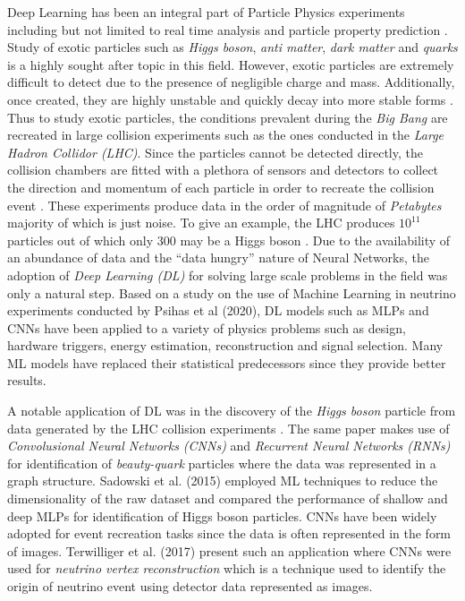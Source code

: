Deep Learning has been an integral part of Particle Physics
experiments \cite{radovic2018machine, sadowski2015deep, de2019machine,
  psihas2020review, terwilliger2017vertex} including but not limited
to real time analysis and particle property prediction
\cite{radovic2018machine}. Study of exotic particles such as
\emph{Higgs boson}, \emph{anti matter}, \emph{dark matter} and
\emph{quarks} is a highly sought after topic in this field. However,
exotic particles are extremely difficult to detect due to the presence
of negligible charge and mass. Additionally, once created, they are
highly unstable and quickly decay into more stable forms
\cite{sadowski2015deep}. Thus to study exotic particles, the
conditions prevalent during the \emph{Big Bang} are recreated in large
collision experiments such as the ones conducted in the \emph{Large
Hadron Collidor (LHC)}. Since the particles cannot be detected
directly, the collision chambers are fitted with a plethora of sensors
and detectors to collect the direction and momentum of each particle
in order to recreate the collision event \cite{sadowski2015deep}.
These experiments produce data in the order of magnitude of
\emph{Petabytes} majority of which is just noise. To give an example,
the LHC produces $10^{11}$ particles out of which only 300 may be a
Higgs boson \cite{sadowski2015deep}. Due to the availability of an
abundance of data and the ``data hungry'' nature of Neural Networks,
the adoption of \emph{Deep Learning (DL)} for solving large scale
problems in the field was only a natural step. Based on a study on the
use of Machine Learning in neutrino experiments conducted by Psihas et
al (2020), DL models such as MLPs and CNNs have been applied to a
variety of physics problems such as design, hardware triggers, energy
estimation, reconstruction and signal selection. Many ML models have
replaced their statistical predecessors since they provide better
results.

A notable application of DL was in the discovery of the \emph{Higgs
boson} particle from data generated by the LHC collision experiments
\cite{radovic2018machine}. The same paper makes use of
\emph{Convolusional Neural Networks (CNNs)} and \emph{Recurrent Neural
Networks (RNNs)} for identification of \emph{beauty-quark} particles
where the data was represented in a graph structure. Sadowski et al.
(2015) employed ML techniques to reduce the dimensionality of the raw
dataset and compared the performance of shallow and deep MLPs for
identification of Higgs boson particles. CNNs have been widely adopted
for event recreation tasks since the data is often represented in the
form of images. Terwilliger et al. (2017) present such an application
where CNNs were used for \emph{neutrino vertex reconstruction} which
is a technique used to identify the origin of neutrino event using
detector data represented as images.

